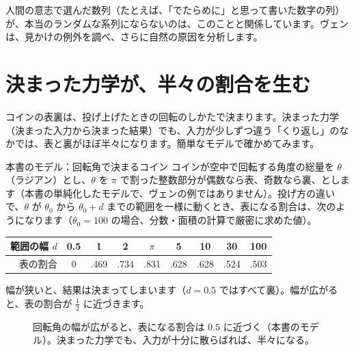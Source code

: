 \documentclass[a4paper,11pt,openany]{ltjsbook}
\begin{document}
人間の意志で選んだ数列（たとえば、「でたらめに」と思って書いた数字の列）が、本当のランダムな系列にならないのは、このことと関係しています。ヴェンは、見かけの例外を調べ、さらに自然の原因を分析します。

\section{決まった力学が、半々の割合を生む}

コインの表裏は、投げ上げたときの回転のしかたで決まります。決まった力学（決まった入力から決まった結果）でも、入力が少しずつ違う「くり返し」のなかでは、表と裏がほぼ半々になります。簡単なモデルで確かめてみます。

\begin{examplebox}{本書のモデル：回転角で決まるコイン}
コインが空中で回転する角度の総量を $\theta$（ラジアン）とし、$\theta$ を $\pi$ で割った整数部分が偶数なら表、奇数なら裏、とします（本書の単純化したモデルで、ヴェンの例ではありません）。投げ方の違いで、$\theta$ が $\theta_0$ から $\theta_0+d$ までの範囲を一様に動くとき、表になる割合は、次のようになります（$\theta_0=100$ の場合、分数・面積の計算で厳密に求めた値）。
\begin{center}
\begin{tabular}{r|cccccccc}
\toprule
範囲の幅 $d$ & 0.5 & 1 & 2 & $\pi$ & 5 & 10 & 30 & 100\\
\midrule
表の割合 & 0 & .469 & .734 & .831 & .628 & .628 & .524 & .503\\
\bottomrule
\end{tabular}
\end{center}
幅が狭いと、結果は決まってしまいます（$d=0.5$ ではすべて裏）。幅が広がると、表の割合が $\tfrac12$ に近づきます。
\end{examplebox}

\begin{figure}[htbp]
\centering
{}
\caption{回転角の幅が広がると、表になる割合は $0.5$ に近づく（本書のモデル）。決まった力学でも、入力が十分に散らばれば、半々になる。}
\end{figure}
\end{document}

